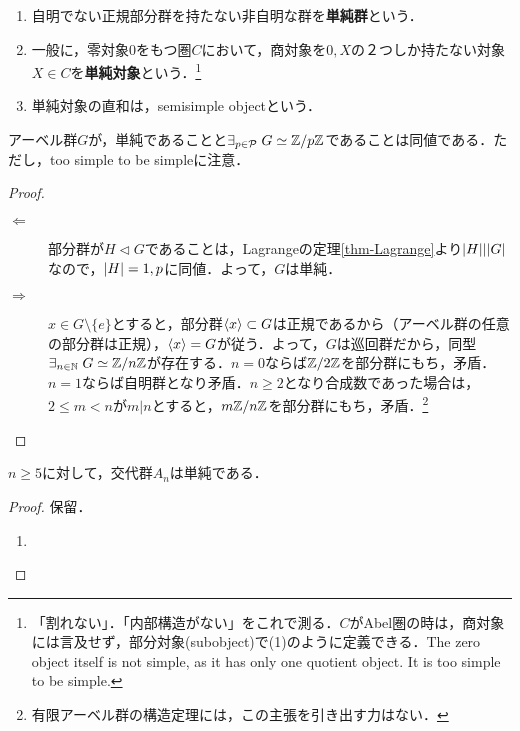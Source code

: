 \documentclass[uplatex,dvipdfmx]{jsreport}
\begin{document}
\begin{definition}\mbox{}
    \begin{enumerate}
        \item 自明でない正規部分群を持たない非自明な群を\textbf{単純群}という．
        \item 一般に，零対象$0$をもつ圏$C$において，商対象を$0,X$の２つしか持たない対象$X\in C$を\textbf{単純対象}という．\footnote{「割れない」．「内部構造がない」をこれで測る．$C$がAbel圏の時は，商対象には言及せず，部分対象(subobject)で(1)のように定義できる．The zero object itself is not simple, as it has only one quotient object. It is too simple to be simple.}
        \item 単純対象の直和は，semisimple objectという．
    \end{enumerate}
\end{definition}

\begin{example}[単純なアーベル群の特徴付け]\label{exp-simple-Abel-groups}
    アーベル群$G$が，単純であることと$\exists_{p\in\mathcal{P}}\;G\simeq\mathbb{Z}/p\mathbb{Z}$であることは同値である．ただし，too simple to be simpleに注意．
    \begin{proof}\mbox{}
        \begin{description}
            \item[$\Leftarrow$] 部分群が$H\triangleleft G$であることは，Lagrangeの定理\ref{thm-Lagrange}より$\lvert H\rvert|\lvert G\rvert$なので，$\lvert H\rvert=1,p$に同値．よって，$G$は単純．
            \item[$\Rightarrow$] $x\in G\setminus\{e\}$とすると，部分群$\langle x\rangle\subset G$は正規であるから（アーベル群の任意の部分群は正規），$\langle x\rangle=G$が従う．よって，$G$は巡回群だから，同型$\exists_{n\in\mathbb{N}}\;G\simeq\mathbb{Z}/n\mathbb{Z}$が存在する．$n=0$ならば$\mathbb{Z}/2\mathbb{Z}$を部分群にもち，矛盾．$n=1$ならば自明群となり矛盾．$n\ge 2$となり合成数であった場合は，$2\le m<n$が$m|n$とすると，$m\mathbb{Z}/n\mathbb{Z}$を部分群にもち，矛盾．\footnote{有限アーベル群の構造定理には，この主張を引き出す力はない．}
        \end{description}
    \end{proof}
\end{example}

\begin{proposition}[方程式の可解性の消息]\label{prop-An-is-simple}
    $n\ge 5$に対して，交代群$A_n$は単純である．
\end{proposition}
\begin{proof}
    保留．
    \begin{enumerate}
        \item 
    \end{enumerate}
\end{proof}
\end{document}
